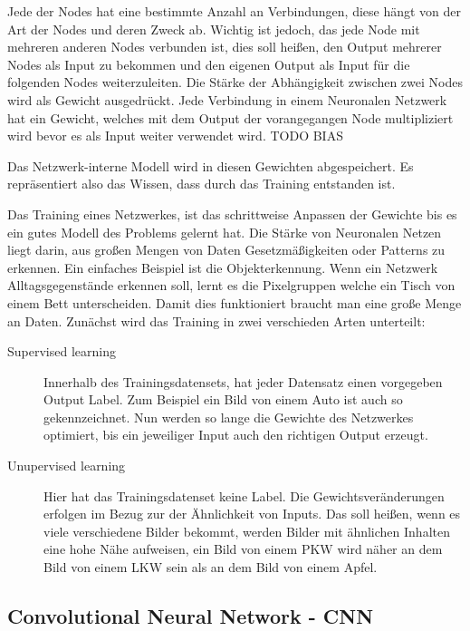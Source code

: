 \documentclass[pdftex,a4paper,halfparskip, article]{scrartcl}
\begin{document}
Jede der Nodes hat eine bestimmte Anzahl an Verbindungen, diese hängt von der Art der Nodes und deren Zweck ab. Wichtig ist jedoch, das jede Node mit mehreren anderen Nodes verbunden ist, dies soll heißen, den Output mehrerer Nodes als Input zu bekommen und den eigenen Output als Input für die folgenden Nodes weiterzuleiten. Die Stärke der Abhängigkeit zwischen zwei Nodes wird als Gewicht ausgedrückt. Jede Verbindung in einem Neuronalen Netzwerk hat ein Gewicht, welches mit dem Output der vorangegangen Node multipliziert wird bevor es als Input weiter verwendet wird. TODO BIAS

Das Netzwerk-interne Modell wird in diesen Gewichten abgespeichert. Es repräsentiert also das Wissen, dass durch das Training entstanden ist.

Das Training eines Netzwerkes, ist das schrittweise Anpassen der Gewichte bis es ein gutes Modell des Problems gelernt hat. Die Stärke von Neuronalen Netzen liegt darin, aus großen Mengen von Daten Gesetzmäßigkeiten oder Patterns zu erkennen. Ein einfaches Beispiel ist die Objekterkennung. Wenn ein Netzwerk Alltagsgegenstände erkennen soll, lernt es die Pixelgruppen welche ein Tisch von einem Bett unterscheiden. Damit dies funktioniert braucht man eine große Menge an Daten. Zunächst wird das Training in zwei verschieden Arten unterteilt: 

\begin{description}
	\item[Supervised learning] Innerhalb des Trainingsdatensets, hat jeder Datensatz einen vorgegeben Output Label. Zum Beispiel ein Bild von einem Auto ist auch so gekennzeichnet. Nun werden so lange die Gewichte des Netzwerkes optimiert, bis ein jeweiliger Input auch den richtigen Output erzeugt.
	\item[Unupervised learning] Hier hat das Trainingsdatenset keine Label. Die Gewichtsveränderungen erfolgen im Bezug zur der Ähnlichkeit von Inputs. Das soll heißen, wenn es viele verschiedene Bilder bekommt, werden Bilder mit ähnlichen Inhalten eine hohe Nähe aufweisen, ein Bild von einem PKW wird näher an dem Bild von einem LKW sein als an dem Bild von einem Apfel.
\end{description}

\subsection{Convolutional Neural Network - CNN}
\end{document}
